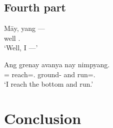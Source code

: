 \documentclass[12pt,paper=a4]{scrartcl}
\begin{document}
\subsection{Fourth part}

\begin{exe}
\ex \label{ex:4a}
	\gll Māy, yang --- \\
		well \Fsg.\Aarg{} \\
	\trans `Well, I ---'

\ex \label{ex:4b}
	\gll Ang grenay avanya nay nimpyang. \\
		\AgtT= reach=\Fsg.\Top{} ground-\Loc{} and run=\Fsg.\Aarg{} \\
	\trans `I reach the bottom and run.'
\end{exe}

\section{Conclusion}




\begingroup\multicolsep=0pt
\printglossary[
	style=threecolumn,
	type=leipzig,
]
\endgroup

\printbibliography[heading=bibintoc]
\end{document}
